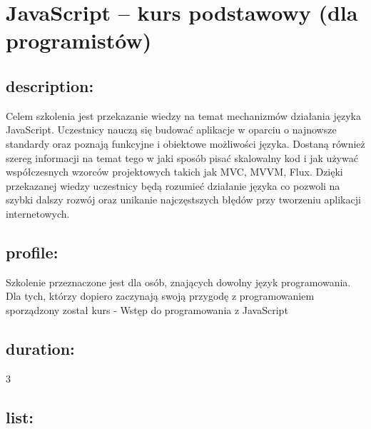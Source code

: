 \documentclass{article}[10pt]
\begin{document}
	\pagestyle{empty} %
    \tableofcontents %
    \cleardoublepage %
    \pagestyle{fancy} %
    \setcounter{page}{1} %

	\newpage
    
	\section{JavaScript – kurs podstawowy (dla programistów)}

	\subsection*{description:}
	\begin{adjustwidth}{2cm}{}
		Celem szkolenia jest przekazanie wiedzy na temat mechanizmów działania języka JavaScript.
Uczestnicy nauczą się budować aplikacje w oparciu o najnowsze standardy oraz poznają funkcyjne i obiektowe możliwości języka. Dostaną również szereg informacji na temat tego w jaki sposób pisać skalowalny kod i jak używać współczesnych wzorców projektowych takich jak
MVC, MVVM, Flux. Dzięki przekazanej wiedzy uczestnicy będą rozumieć działanie języka co pozwoli na szybki dalszy rozwój oraz unikanie najczęstszych błędów przy tworzeniu aplikacji internetowych.
	\end{adjustwidth}
	\subsection*{profile:}
\begin{adjustwidth}{2cm}{}
	
Szkolenie przeznaczone jest dla osób, znających dowolny język programowania. Dla tych, którzy dopiero zaczynają swoją przygodę z programowaniem sporządzony został kurs - Wstęp do programowania z JavaScript

\end{adjustwidth}
	\subsection*{duration:}
\begin{adjustwidth}{2cm}{}
	3
\end{adjustwidth}

	\subsection*{list:}
\begin{adjustwidth}{1.5cm}{}
	\begin{itemize}




















	\end{itemize}
\end{adjustwidth}
\end{document}
